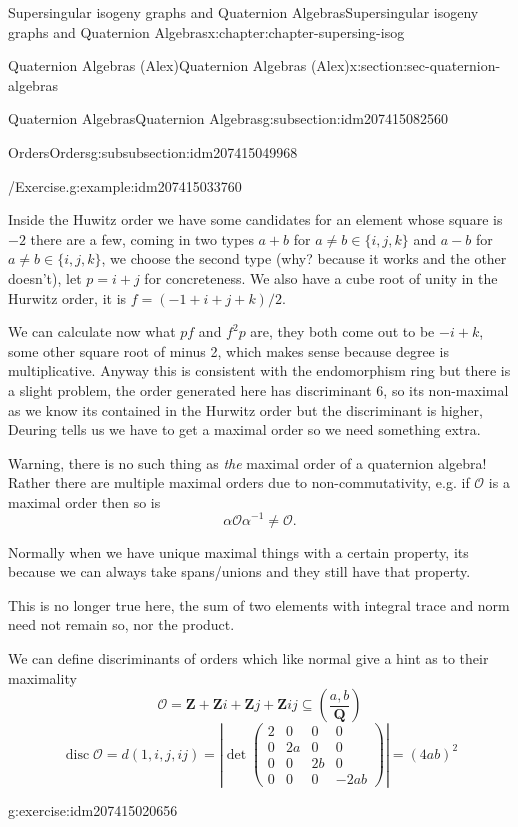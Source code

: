 \documentclass[oneside,10pt,]{book}
\numberwithin{equation}{section}
\newcommand{\inv}{^{-1}}
\newcommand{\legendre}[2]{\left(\frac{#1}{#2}\right)}
\newcommand{\ZZ}{\mathbf{Z}}
\newcommand{\QQ}{\mathbf{Q}}
\newcommand{\ints}{\mathcal{O}}
\DeclareMathOperator{\disc}{disc}
\newcommand{\amp}{&}
\begin{document}
\begin{chapterptx}{Supersingular isogeny graphs and Quaternion Algebras}{}{Supersingular isogeny graphs and Quaternion Algebras}{}{}{x:chapter:chapter-supersing-isog}
\begin{sectionptx}{Quaternion Algebras (Alex)}{}{Quaternion Algebras (Alex)}{}{}{x:section:sec-quaternion-algebras}
\begin{subsectionptx}{Quaternion Algebras}{}{Quaternion Algebras}{}{}{g:subsection:idm207415082560}
\begin{subsubsectionptx}{Orders}{}{Orders}{}{}{g:subsubsection:idm207415049968}
\begin{example}{\slash{}Exercise.}{g:example:idm207415033760}
\par
Inside the Huwitz order we have some candidates for an element whose square is \(-2\) there are a few, coming in two types \(a+ b\) for \(a \ne b \in \{i,j,k\}\) and \(a-b\) for \(a\ne b\in \{i,j,k\}\), we choose the second type (why? because it works and the other doesn't), let \(p = i + j\) for concreteness. We also have a cube root of unity in the Hurwitz order, it is \(f = (-1 + i + j + k)/2\).%
\par
We can calculate now what \(pf\) and \(f^2 p\) are, they both come out to be \(- i + k\), some other square root of minus 2, which makes sense because degree is multiplicative. Anyway this is consistent with the endomorphism ring but there is a slight problem, the order generated here has discriminant \(6\), so its non-maximal as we know its contained in the Hurwitz order but the discriminant is higher, Deuring tells us we have to get a maximal order so we need something extra.%
\end{example}
Warning, there is no such thing as \emph{the} maximal order of a quaternion algebra! Rather there are multiple maximal orders due to non-commutativity, e.g. if \(\ints\) is a maximal order then so is%
\begin{equation*}
\alpha \ints \alpha\inv \ne \ints\text{.}
\end{equation*}
%
\par
Normally when we have unique maximal things with a certain property, its because we can always take spans\slash{}unions and they still have that property.%
\par
This is no longer true here, the sum of two elements with integral trace and norm need not remain so, nor the product.%
\par
We can define discriminants of orders which like normal give a hint as to their maximality%
\begin{equation*}
\ints = \ZZ + \ZZ i + \ZZ j + \ZZ ij \subseteq \legendre{a,b}{\QQ}
\end{equation*}
%
\begin{equation*}
\disc \ints  = d(1,i,j,ij) = \left| \det\begin{pmatrix} 2 \amp 0 \amp 0\amp 0 \\ 0 \amp 2a \amp 0 \amp 0 \\ 0 \amp 0 \amp 2b \amp 0 \\ 0 \amp 0 \amp 0 \amp -2ab\end{pmatrix}\right| = (4ab)^2
\end{equation*}
%
\begin{inlineexercise}{}{g:exercise:idm207415020656}%

\end{inlineexercise}
\end{subsubsectionptx}
\end{subsectionptx}
\end{sectionptx}
\end{chapterptx}
\end{document}
